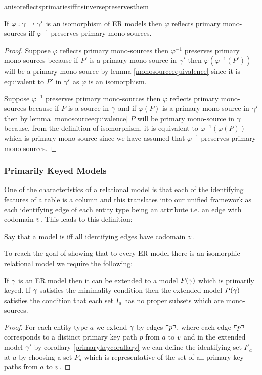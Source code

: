 anisoreflectsprimariesiffitsinversepreservesthem
\begin{lemma}
\label{anisoreflectsprimariesiffitsinversepreservesthem}
If $\varphi: \gamma \rightarrow \gamma'$ is an isomorphism of ER models  then
$\varphi$ reflects primary mono-sources iff $\varphi^{-1}$ preserves primary mono-sources.
\end{lemma}
\begin{proof}
Suppose $\varphi$ reflects primary mono-sources then $\varphi^{-1}$ preserves primary mono-sources because
if $P'$ is a primary mono-source in $\gamma'$ then $\varphi(\varphi^{-1}(P'))$ will be a primary mono-source by lemma \ref{monosourceequivalence} since it is equivalent to $P'$ in $\gamma'$ as $\varphi$ is an isomorphism. 

Suppose $\varphi^{-1}$ preserves primary mono-sources then $\varphi$ reflects primary mono-sources because
if $P$ is a source in $\gamma$ and if $\varphi(P)$ is a primary mono-source in $\gamma'$ then
by lemma \ref{monosourceequivalence} $P$ will be primary mono-source in $\gamma$ because, from the definition of
isomorphism, it is equivalent to $\varphi^{-1}(\varphi(P))$ which is primary mono-source since we have assumed
that  $\varphi^{-1}$ preserves primary mono-sources.

\end{proof}

\subsubsection{Primarily Keyed Models}

One of the characteristics of a relational model is that each of the identifying features of a table is a column
and this translates into our unified framework as each identifying edge of each entity type being an attribute i.e. 
an edge with codomain $v$. This leads to this definition: 
\begin{definition}
Say that a model is  iff all identifying edges 
have codomain $v$.
\end{definition}
To reach the goal of showing that to every ER model there is an isomorphic relational model we require the following:
\begin{lemma}
If $\gamma$ is an ER model then it can be extended to a model $P(\gamma)$
which is primarily keyed. If $\gamma$ satisfies the minimality condition then the
extended model $P(\gamma)$ satisfies the  condition that each set $I_a$ has no proper subsets which are mono-sources. 
\end{lemma}
\begin{proof}
For each entity type $a$ we extend $\gamma$ by edges $\left\ulcorner p\right\urcorner$, where each edge 
$\left\ulcorner p\right\urcorner$ corresponds to a distinct primary key path $p$ from $a$ to $v$
and in the extended model $\gamma'$ by corollary \ref{primarykeycorallary} 
we can define the identifying set $I'_a$ at $a$ by choosing a set $P_a$ which is representative of the set of all primary key paths from $a$ to $v$.
\end{proof}

